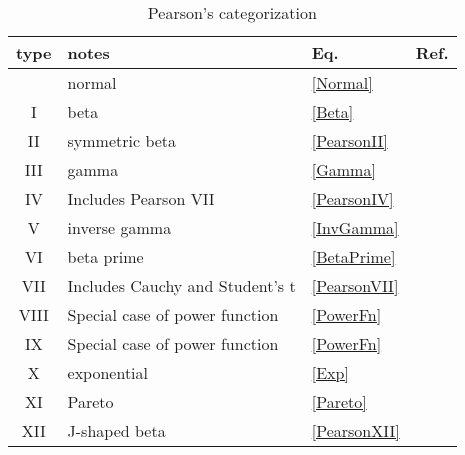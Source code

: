 \begin{table}
\begin{center}
\label{PearsonTypesTable}
\caption{Pearson's categorization}
\begin{tabular}{clll}
\\
type & notes & Eq. & Ref.\\
\hline
 & normal & \eqref{Normal} & \cite{Pearson1895}  \\
I  & beta & \eqref{Beta} & \cite{Pearson1895}  \\
II &  symmetric beta & \eqref{PearsonII} & \cite{Pearson1895}  \\
III  &   gamma & \eqref{Gamma}& \cite{Pearson1893}  \\
IV  & Includes Pearson VII & \eqref{PearsonIV}& \cite{Pearson1895}  \\
V   &  inverse gamma & \eqref{InvGamma}& \cite{Pearson1901}  \\
VI   & beta prime &  \eqref{BetaPrime} & \cite{Pearson1901}  \\
VII   & Includes Cauchy and Student's t  &\eqref{PearsonVII} & \cite{Pearson1916}  \\ 
VIII   & Special case of power function & \eqref{PowerFn} & \cite{Pearson1916}  \\
IX  & Special case of power function & \eqref{PowerFn} & \cite{Pearson1916}  \\
X   & exponential & \eqref{Exp} & \cite{Pearson1916}  \\
XI   & Pareto & \eqref{Pareto} & \cite{Pearson1916}  \\
XII   & J-shaped beta  &\eqref{PearsonXII} & \cite{Pearson1916}  \\
\end{tabular}
\end{center}
\end{table}




